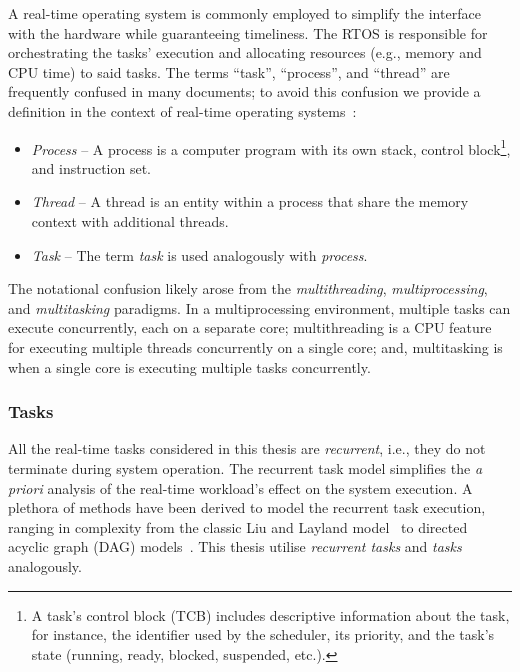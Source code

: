 A real-time operating system is commonly employed to simplify the interface with the hardware while guaranteeing timeliness.
The RTOS is responsible for orchestrating the tasks' execution and allocating resources (e.g., memory and CPU time) to said tasks.
The terms ``task'', ``process'', and ``thread'' are frequently confused in many documents; to avoid this confusion we provide a definition in the context of real-time operating systems~\addref{}:
%
\begin{itemize}
    \item \emph{Process} -- A process is a computer program with its own stack, control block\footnote{A task's control block (TCB) includes descriptive information about the task, for instance, the identifier used by the scheduler, its priority, and the task's state (running, ready, blocked, suspended, etc.).}, and instruction set.

    \item \emph{Thread} -- A thread is an entity within a process that share the memory context with additional threads.

    \item \emph{Task} -- The term \emph{task} is used analogously with \emph{process}.
\end{itemize}
%
The notational confusion likely arose from the \emph{multithreading}, \emph{multiprocessing}, and \emph{multitasking} paradigms.
In a multiprocessing environment, multiple tasks can execute concurrently, each on a separate core; multithreading is a CPU feature for executing multiple threads concurrently on a single core; and, multitasking is when a single core is executing multiple tasks concurrently.

\subsubsection*{Tasks~}%
%
%    
All the real-time tasks considered in this thesis are \emph{recurrent}, i.e., they do not terminate during system operation.
The recurrent task model simplifies the \emph{a priori} analysis of the real-time workload's effect on the system execution.
A plethora of methods have been derived to model the recurrent task execution, ranging in complexity from the classic Liu and Layland model~\cite{Liu:1973} to directed acyclic graph (DAG) models~\cite{Saifullah:2014}.
This thesis utilise \emph{recurrent tasks} and \emph{tasks} analogously.


